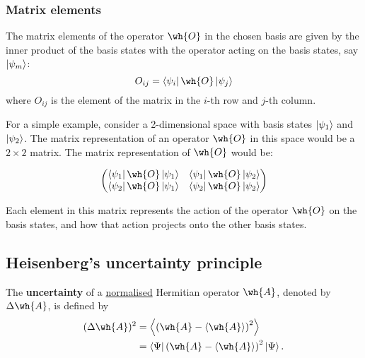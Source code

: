 \documentclass[12pt, a4paper]{article}
\begin{document}
\subsubsection{Matrix elements}

\begin{mdprop}
    The matrix elements of the operator \(\wh{O}\) in the chosen basis are given by the inner product of the basis states with the operator acting on the basis states, say \(\ket{\psi_m}\):
    \[O_{ij} = \bra{\psi_i} \wh{O} \ket{\psi_j}\]
where \( O_{ij} \) is the element of the matrix in the \(i\)-th row and \(j\)-th column.

\end{mdprop}

\begin{mdexample}
    For a simple example, consider a 2-dimensional space with basis states \( \ket{\psi_1} \) and \( \ket{\psi_2} \). The matrix representation of an operator \( \wh{O} \) in this space would be a \(2\times2\) matrix. The matrix representation of \( \wh{O} \) would be:

\[
\begin{pmatrix}
\bra{\psi_1} \wh{O} \ket{\psi_1} & \bra{\psi_1} \wh{O} \ket{\psi_2} \\
\bra{\psi_2} \wh{O} \ket{\psi_1} & \bra{\psi_2} \wh{O} \ket{\psi_2}
\end{pmatrix}
\]

Each element in this matrix represents the action of the operator \( \wh{O} \) on the basis states, and how that action projects onto the other basis states.

\end{mdexample}

\subsection{Heisenberg's uncertainty principle}

\begin{definition}
    The \textbf{uncertainty} of a \underline{normalised} Hermitian operator \(\wh{A}\), denoted by \(\Delta \wh{A}\), is defined by 
    \[\begin{aligned}
        ( \Delta \wh{A} )^2 &= \left\langle \left(\wh{A}-\langle \wh{A} \rangle\right)^2 \right\rangle \\
        &= \bra{\Psi} \left( \wh{A}-\langle \wh{A}\rangle \right)^2 \ket{\Psi}.
    \end{aligned}\]
\end{definition}
\end{document}
